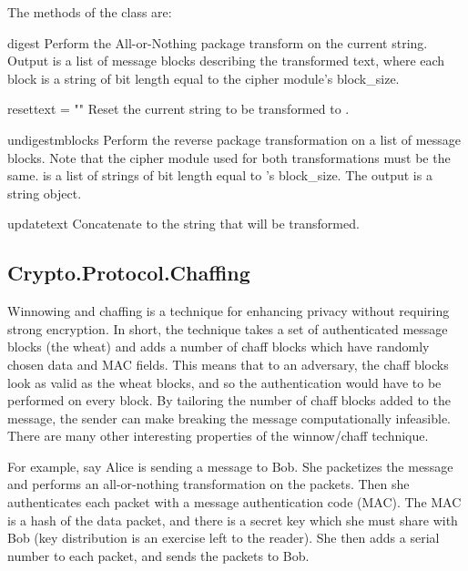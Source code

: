\documentclass{howto}
\begin{document}
The methods of the  class are:

\begin{methoddesc}{digest}{}
Perform the All-or-Nothing package transform on the current
string.  Output is a list of message blocks describing the
transformed text, where each block is a string of bit length equal
to the cipher module's block_size.
\end{methoddesc}

\begin{methoddesc}{reset}{text = ""}
Reset the current string to be transformed to .
\end{methoddesc}

\begin{methoddesc}{undigest}{mblocks}
Perform the reverse package transformation on a list of message
blocks.  Note that the cipher module used for both transformations
must be the same.   is a list of strings of bit length
equal to 's block_size.  The output is a string object.
\end{methoddesc}

\begin{methoddesc}{update}{text}
Concatenate  to the string that will be transformed.
\end{methoddesc}

\subsection{Crypto.Protocol.Chaffing}

Winnowing and chaffing is a technique for enhancing privacy without requiring
strong encryption.  In short, the technique takes a set of authenticated
message blocks (the wheat) and adds a number of chaff blocks which have
randomly chosen data and MAC fields.  This means that to an adversary, the
chaff blocks look as valid as the wheat blocks, and so the authentication
would have to be performed on every block.  By tailoring the number of chaff
blocks added to the message, the sender can make breaking the message
computationally infeasible.  There are many other interesting properties of
the winnow/chaff technique.

For example, say Alice is sending a message to Bob.  She packetizes the
message and performs an all-or-nothing transformation on the packets.  Then
she authenticates each packet with a message authentication code (MAC).  The
MAC is a hash of the data packet, and there is a secret key which she must
share with Bob (key distribution is an exercise left to the reader).  She then
adds a serial number to each packet, and sends the packets to Bob.
\end{document}
